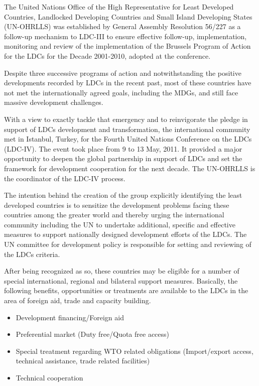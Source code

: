 \documentclass[
  openany]{book}
\providecommand{\tightlist}{%
  \setlength{\itemsep}{0pt}\setlength{\parskip}{0pt}}
\begin{document}
The United Nations Office of the High Representative for Least Developed Countries, Landlocked Developing Countries and Small Island Developing States (UN-OHRLLS) was established by General Assembly Resolution 56/227 as a follow-up mechanism to LDC-III to ensure effective follow-up, implementation, monitoring and review of the implementation of the Brussels Program of Action for the LDCs for the Decade 2001-2010, adopted at the conference.

Despite three successive programs of action and notwithstanding the positive developments recorded by LDCs in the recent past, most of these countries have not met the internationally agreed goals, including the MDGs, and still face massive development challenges.

With a view to exactly tackle that emergency and to reinvigorate the pledge in support of LDCs development and transformation, the international community met in Istanbul, Turkey, for the Fourth United Nations Conference on the LDCs (LDC-IV). The event took place from 9 to 13 May, 2011. It provided a major opportunity to deepen the global partnership in support of LDCs and set the framework for development cooperation for the next decade. The UN-OHRLLS is the coordinator of the LDC-IV process.

The intention behind the creation of the group explicitly identifying the least developed countries is to sensitize the development problems facing these countries among the greater world and thereby urging the international community including the UN to undertake additional, specific and effective measures to support nationally designed development efforts of the LDCs. The UN committee for development policy is responsible for setting and reviewing of the LDCs criteria.

After being recognized as so, these countries may be eligible for a number of special international, regional and bilateral support measures. Basically, the following benefits, opportunities or treatments are available to the LDCs in the area of foreign aid, trade and capacity building.

\begin{itemize}
\tightlist
\item
  Development financing/Foreign aid
\item
  Preferential market (Duty free/Quota free access)
\item
  Special treatment regarding WTO related obligations (Import/export access, technical assistance, trade related facilities)
\item
  Technical cooperation
\end{itemize}
\end{document}
